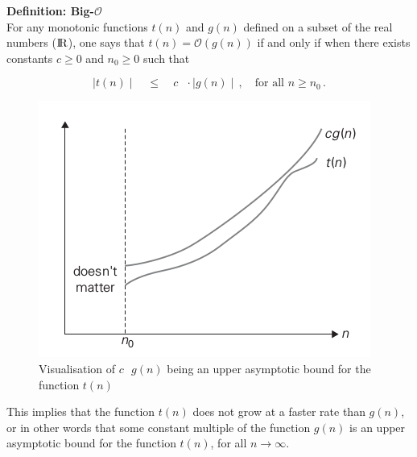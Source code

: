 \begin{redbox}
\textbf{Definition: Big-$\mathcal{O}$}\\
\newline
For any monotonic functions $t(n)$ and $g(n)$ defined on a subset of the real numbers (${\rm I\!R}$), one says that $t(n) = \mathcal{O}(g(n))$ if and only if when there exists constants $c \geq 0$ and $n_0 \geq 0$ such that

\begin{equation}
\mid t(n) \mid \quad \leq \quad c\text{ }\cdot\mid g(n) \mid\, , \quad \text{for all } n \geq n_0\, .
\end{equation}
\end{redbox}
\begin{redbox}
\begin{figure}[H]
      \centering
       \includegraphics[scale=0.5]{img/asymptoticupperbound.png}
       \caption[]{\label{fig:upperasym} Visualisation of $c\text{ }g(n)$ being an upper asymptotic bound for the function $t(n)$\footnotemark[5]}
\end{figure}


This implies that the function $t(n)$ does not grow at a faster rate than $g(n)$, or in other words that some constant multiple of the function $g(n)$ is an upper asymptotic bound for the function $t(n)$, for all $n\rightarrow \infty$.
\end{redbox}

